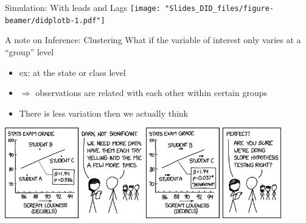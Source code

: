 \documentclass[
  ignorenonframetext,
]{beamer}
\begin{document}
\begin{frame}{Simulation: With leads and Lags}
\protect\hypertarget{simulation-with-leads-and-lags-7}{}
\texttt{[image: "Slides\_DID\_files/figure-beamer/didplotb-1.pdf"]}
\end{frame}

\begin{frame}{A note on Inference: Clustering}
\protect\hypertarget{a-note-on-inference-clustering}{}
What if the variable of interest only varies at a ``group'' level

\begin{itemize}
\item
  ex: at the state or class level
\item
  \(\Rightarrow\) observations are related with each other within
  certain groups
\item
  There is less variation then we actually think
\end{itemize}

\includegraphics[width=0.9\textwidth,height=\textheight]{"images/cluster_comic.png"}
\end{frame}
\end{document}
